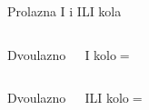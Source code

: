 \begin{frame}[label=09_3-s053]{Prolazna I i ILI kola}
\begin{columns}[c,onlytextwidth]Dvoulazno\par I kolo\centering{}$=$\centering\end{columns}\medskip
\begin{columns}[c,onlytextwidth]Dvoulazno\par ILI kolo\centering{}$=$\centering\end{columns}
\end{frame}
